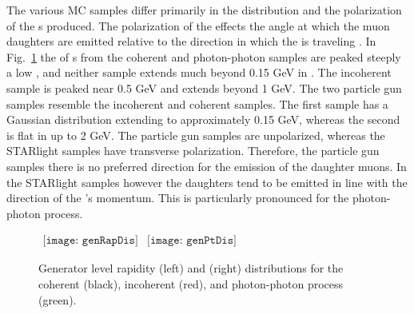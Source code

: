     The various MC samples differ primarily in the 
      \pt{} distribution and the polarization of the \JPsi{}s produced. 
      The polarization of the \JPsi{} effects the angle at which the muon daughters
      are emitted relative to the direction in which the \JPsi{} is traveling 
      \cite{oniaPol}. 
    In Fig.~\ref{fig:starlightRapPtDist} the \pt{} of \JPsi{}s from the 
      coherent and photon-photon samples are peaked steeply a low \pt{}, and 
      neither sample extends much beyond 0.15 GeV in \pt{}.
    The incoherent sample is peaked near 0.5 GeV and extends beyond 1 GeV.
    The two particle gun samples resemble the incoherent and coherent samples.
    The first sample has a Gaussian \pt{} distribution extending to 
      approximately 0.15 GeV, whereas the second is flat in \pt{} up to
      2 GeV.
    The particle gun samples are unpolarized, whereas the STARlight samples 
      have transverse polarization. 
    Therefore, the particle gun samples there is no preferred direction for the 
      emission of the daughter muons.
    In the STARlight samples however the daughters tend to be emitted in line
      with the direction of the \JPsi{}'s momentum.
    This is particularly pronounced for the photon-photon process.

    \begin{figure}[!Hhbt]
      \centering
      $ \begin{array}{cc}
        \texttt{[image: genRapDis]} &
        \texttt{[image: genPtDis]}
      \end{array} $
      \caption{Generator level rapidity (left) and \pt{} (right) 
          distributions for the coherent (black), incoherent (red), 
          and photon-photon process (green).}
      \label{fig:starlightRapPtDist}
    \end{figure}
    
